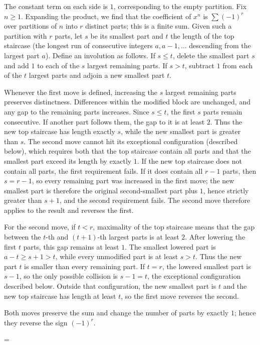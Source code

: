 \documentclass[11pt]{article}
\makeatletter
\theoremstyle{ntstyle}
\let\nt@closedisplay\]
\def\nt@guardedclose{\@ifnextchar\par{\nt@closeafterpar}{\@ifnextchar\end{\postdisplaypenalty\@M\nt@closedisplay}{\nt@closedisplay}}}
\def\nt@closeafterpar\par{\@ifnextchar\par{\nt@closeafterpar}{\@ifnextchar\end{\postdisplaypenalty\@M\nt@closedisplay\par}{\nt@closedisplay\par}}}
\renewenvironment{proof}[1][\proofname]{\par
  \pushQED{\qed}\normalfont\topsep\medskipamount\edef\nt@afterproof{\@endparpenalty=\the\@endparpenalty\relax}\@beginparpenalty\@M\@endparpenalty\@M\let\]\nt@guardedclose\trivlist\item[]\textit{#1\@addpunct{.}} \ignorespaces}{\ifvmode\addpenalty\@M\fi\popQED\nt@afterproof\endtrivlist\@endpefalse}
\makeatother
\begin{document}
\begin{proof} The constant term on each side is $1$, corresponding to
	the empty partition. Fix $n\ge1$. Expanding the product, we find that the coefficient
	of $x^n$ is $\sum(-1)^r$ over partitions of $n$ into $r$ distinct parts;
	this is a finite sum. Given such a partition with $r$ parts, let $s$ be its smallest
	part and $t$ the length of the top staircase (the
	longest run of consecutive integers $a,a-1,\ldots$ descending from the
	largest part $a$). Define an involution as follows. If $s\le t$,
	delete the smallest part $s$ and add $1$ to each of the $s$ largest
	remaining parts. If $s>t$, subtract $1$ from each of the $t$ largest
	parts and adjoin a new smallest part $t$.

	Whenever the first move is defined, increasing the $s$ largest
	remaining parts preserves distinctness. Differences within the
	modified block are unchanged, and any gap to the remaining parts
	increases. Since $s\le t$, the first $s$ parts remain consecutive.
	If another part follows them, the gap to it is at least $2$.
	Thus the new top staircase has length exactly $s$, while the new
	smallest part is greater than $s$. The second move cannot hit its
	exceptional configuration (described below), which requires both that the
	top staircase contain all parts and that the smallest part exceed its
	length by exactly $1$. If the new top staircase does not contain
	all parts, the first requirement fails. If it does contain
	all $r-1$ parts, then $s=r-1$, so every remaining part was increased
	in the first move; the new smallest part is therefore the original
	second-smallest part plus $1$, hence strictly greater than $s+1$, and
	the second requirement fails. The second move therefore
	applies to the result and reverses the first.

	For the second move, if $t<r$, maximality of the top staircase
	means that the gap between the $t$-th and $(t+1)$-th largest parts
	is at least $2$. After lowering the first $t$ parts, this gap
	remains at least $1$. The smallest lowered part is $a-t\ge s+1>t$,
	while every unmodified part is at least $s>t$. Thus the new part $t$ is smaller than every
	remaining part. If $t=r$, the lowered smallest part is $s-1$,
	so the only possible collision is $s-1=t$, the exceptional
	configuration described below. Outside that configuration, the
	new smallest part is $t$ and the new top staircase has length
	at least $t$, so the first move reverses the second.

	Both moves preserve the sum and change the number of parts by exactly $1$; hence they reverse the sign $(-1)^r$.


\end{proof}
\end{document}
